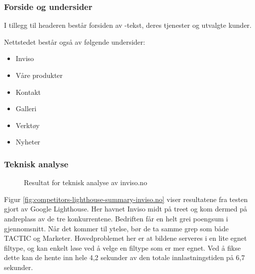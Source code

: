 \subsubsection{Forside og undersider}
I tillegg til headeren består forsiden av -tekst, deres tjenester og utvalgte kunder. 

Nettstedet består også av følgende undersider:
\begin{itemize}
\item Inviso
\item Våre produkter
\item Kontakt
\item Galleri
\item Verktøy
\item Nyheter
\end{itemize}


\subsubsection{Teknisk analyse}

\begin{figure}[H]
    \begin{center}
        
        \label{fig:competitors-tech_analysis-inviso.no}
        \caption{Resultat for teknisk analyse av inviso.no}
    \end{center}
\end{figure}

Figur \ref{fig:competitors-lighthouse-summary-inviso.no} viser resultatene fra testen gjort av Google Lighthouse. Her havnet Inviso midt på treet og kom dermed på andreplass av de tre konkurrentene. Bedriften får en helt grei poengsum i gjennomsnitt. Når det kommer til ytelse, bør de ta samme grep som både TACTIC og Marketer. Hovedproblemet her er at bildene serveres i en lite egnet filtype, og kan enkelt løse ved å velge en filtype som er mer egnet. Ved å fikse dette kan de hente inn hele 4,2 sekunder av den totale innlastningstiden på 6,7 sekunder.

